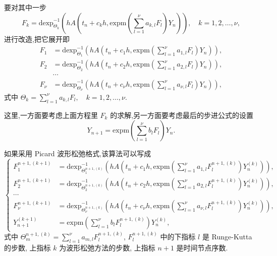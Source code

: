 要对其中一步
\begin{equation*}
	F_k=\mbox{dexp}_{\Theta_k}^{-1}(hA(t_n+c_kh,\mbox{expm}(\sum_{l=1}^{\nu}a_{k,l}F_l)Y_n)),\quad k=1,2,\ldots,\nu,
\end{equation*}
进行改造,把它展开即
\begin{equation*}
	\begin{aligned}
		F_1&=\mbox{dexp}_{\Theta_1}^{-1}(hA(t_n+c_1h,\mbox{expm}(\sum_{l=1}^{\nu}a_{1,l}F_l)Y_n)),\\
		F_2&=\mbox{dexp}_{\Theta_2}^{-1}(hA(t_n+c_2h,\mbox{expm}(\sum_{l=1}^{\nu}a_{2,l}F_l)Y_n)),\\
		&\cdots \\
		F_{\nu}&=\mbox{dexp}_{\Theta_{\nu}}^{-1}(hA(t_n+c_{\nu}h,\mbox{expm}(\sum_{l=1}^{\nu}a_{\nu,l}F_l)Y_n)),
	\end{aligned}
\end{equation*}
式中 $\Theta_k=\sum_{l=1}^{\nu}a_{k,l}F_l,\quad k=1,2,\ldots,\nu$.

这里,一方面要考虑上面方程里 $F_k$ 的求解,另一方面要考虑最后的步进公式的设置
\begin{equation*}
	Y_{n+1}=\mbox{expm}(\sum_{l=1}^{\nu}b_lF_l)Y_n.
\end{equation*}

如果采用 Picard 波形松弛格式,该算法可以写成
\begin{equation*}
	\left\lbrace\begin{aligned}
		F_1^{n+1,(k+1)}&=\mbox{dexp}_{\Theta_1^{n+1,(k)}}^{-1}(hA(t_n+c_1h,\mbox{expm}(\sum_{l=1}^{\nu}a_{1,l}F_l^{n+1,(k)})Y_n^{(k)})),\\
		F_2^{n+1,(k+1)}&=\mbox{dexp}_{\Theta_2^{n+1,(k)}}^{-1}(hA(t_n+c_2h,\mbox{expm}(\sum_{l=1}^{\nu}a_{2,l}F_l^{n+1,(k)})Y_n^{(k)})),\\
		\cdots \\
		F_{\nu}^{n+1,(k+1)}&=\mbox{dexp}_{\Theta_{\nu}^{n+1,(k)}}^{-1}(hA(t_n+c_{\nu}h,\mbox{expm}(\sum_{l=1}^{\nu}a_{\nu,l}F_l^{n+1,(k)})Y_n^{(k)})),\\
		Y_{n+1}^{(k+1)}&=\mbox{expm}(\sum_{l=1}^{\nu}b_lF_l^{n+1,(k)})Y_n^{(k)},
	\end{aligned}\right.
\end{equation*}
式中 $\Theta_m^{n+1,(k)} = \sum_{l=1}^{\nu}a_{m,l}F_l^{n+1,(k)}$, $F_l^{n+1,(k)}$ 中的下指标 $l$ 是 Runge-Kutta 的步数, 上指标 $k$ 为波形松弛方法的步数, 上指标 $n+1$ 是时间节点序数.

